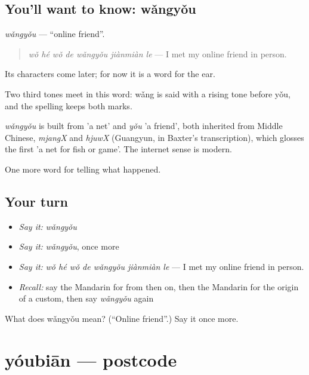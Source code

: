 \subsection*{You'll want to know: wǎngyǒu}
\emph{wǎngyǒu} — \textquotedblleft{}online friend\textquotedblright{}.

\begin{quote}
\emph{wǒ hé wǒ de wǎngyǒu jiànmiàn le} — I met my online friend in person.
\end{quote}

Its characters come later; for now it is a word for the ear.

Two third tones meet in this word: wǎng is said with a rising tone before yǒu, and the spelling keeps both marks.

\begin{cousinweb}
\emph{wǎngyǒu} is built from  'a net' and \emph{yǒu} 'a friend', both inherited from Middle Chinese, \emph{mjangX} and \emph{hjuwX} (Guangyun, in Baxter's transcription), which glosses the first 'a net for fish or game'. The internet sense is modern.
\end{cousinweb}

\begin{grammarlens}[title={What you've built}]
One more word for telling what happened.
\end{grammarlens}

\subsection*{Your turn}
\begin{itemize}
\raggedright
  \item \emph{Say it:} \emph{wǎngyǒu}
  \item \emph{Say it:} \emph{wǎngyǒu}, once more
  \item \emph{Say it:} \emph{wǒ hé wǒ de wǎngyǒu jiànmiàn le} — I met my online friend in person.
  \item \emph{Recall:} say the Mandarin for from then on, then the Mandarin for the origin of a custom, then say \emph{wǎngyǒu} again
\end{itemize}

\begin{tcolorbox}[breakable,colback=teal!4,colframe=teal!35!black,title={Before you move on}]
What does wǎngyǒu mean? (\textquotedblleft{}Online friend\textquotedblright{}.) Say it once more.
\end{tcolorbox}
\section[yóubiān]{yóubiān — postcode}

